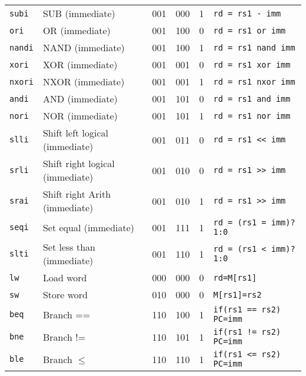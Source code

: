 \documentclass[a4paper]{article}
\begin{document}
\begin{longtable}{|l|l|c|c|c|l|}
        \texttt{subi}  & SUB (immediate)                 & 001    & 000    & 1      & \texttt{rd = rs1 - imm}       \\
        \texttt{ori}   & OR (immediate)                  & 001    & 100    & 0      & \texttt{rd = rs1 or imm}      \\
        \texttt{nandi} & NAND (immediate)                & 001    & 100    & 1      & \texttt{rd = rs1 nand imm}    \\
        \texttt{xori}  & XOR (immediate)                 & 001    & 001    & 0      & \texttt{rd = rs1 xor imm}     \\
        \texttt{nxori} & NXOR (immediate)                & 001    & 001    & 1      & \texttt{rd = rs1 nxor imm}    \\
        \texttt{andi}  & AND (immediate)                 & 001    & 101    & 0      & \texttt{rd = rs1 and imm}     \\
        \texttt{nori}  & NOR (immediate)                 & 001    & 101    & 1      & \texttt{rd = rs1 nor imm}     \\
        \texttt{slli}  & Shift left logical (immediate)  & 001    & 011    & 0      & \texttt{rd = rs1 << imm}      \\
        \texttt{srli}  & Shift right logical (immediate) & 001    & 010    & 0      & \texttt{rd = rs1 >> imm}      \\
        \texttt{srai}  & Shift right Arith (immediate)   & 001    & 010    & 1      & \texttt{rd = rs1 >> imm}      \\
        \texttt{seqi}  & Set equal (immediate)           & 001    & 111    & 1      & \texttt{rd = (rs1 = imm)?1:0} \\
        \texttt{slti}  & Set less than (immediate)       & 001    & 110    & 1      & \texttt{rd = (rs1 < imm)?1:0} \\
        \hline
        \texttt{lw}    & Load word                       & 000    & 000    & 0      & \texttt{rd=M[rs1]}            \\
        \texttt{sw}    & Store word                      & 010    & 000    & 0      & \texttt{M[rs1]=rs2}           \\
        \hline
        \texttt{beq}   & Branch ==                       & 110    & 100    & 1      & \texttt{if(rs1 == rs2) PC=imm}\\
        \texttt{bne}   & Branch !=                       & 110    & 101    & 1      & \texttt{if(rs1 != rs2) PC=imm}\\
        \texttt{ble}   & Branch \(\leqslant\)            & 110    & 110    & 1      & \texttt{if(rs1 <= rs2) PC=imm}\\

\end{longtable}
\end{document}

